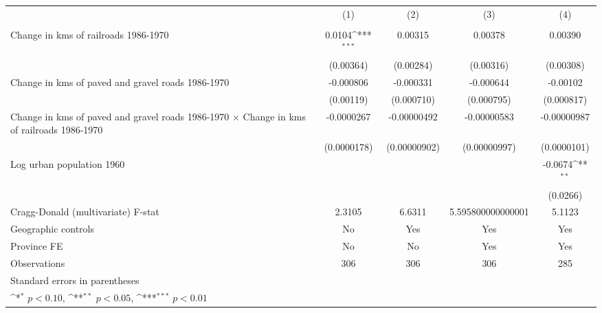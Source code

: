{
\def\sym#1{\ifmmode^{#1}\else\(^{#1}\)\fi}
\begin{tabular}{l*{4}{c}}
\hline\hline
                &\multicolumn{1}{c}{(1)}&\multicolumn{1}{c}{(2)}&\multicolumn{1}{c}{(3)}&\multicolumn{1}{c}{(4)}\\
                &\multicolumn{1}{c}{}&\multicolumn{1}{c}{}&\multicolumn{1}{c}{}&\multicolumn{1}{c}{}\\
\hline
Change in kms of railroads 1986-1970&   0.0104\sym{***}&  0.00315         &  0.00378         &  0.00390         \\
                &(0.00364)         &(0.00284)         &(0.00316)         &(0.00308)         \\
[1em]
Change in kms of paved and gravel roads 1986-1970&-0.000806         &-0.000331         &-0.000644         & -0.00102         \\
                &(0.00119)         &(0.000710)         &(0.000795)         &(0.000817)         \\
[1em]
Change in kms of paved and gravel roads 1986-1970 $\times$ Change in kms of railroads 1986-1970&-0.0000267         &-0.00000492         &-0.00000583         &-0.00000987         \\
                &(0.0000178)         &(0.00000902)         &(0.00000997)         &(0.0000101)         \\
[1em]
Log urban population 1960&                  &                  &                  &  -0.0674\sym{**} \\
                &                  &                  &                  & (0.0266)         \\
\hline
Cragg-Donald (multivariate) F-stat&   2.3105         &   6.6311         &5.595800000000001         &   5.1123         \\
Geographic controls&       No         &      Yes         &      Yes         &      Yes         \\
Province FE     &       No         &       No         &      Yes         &      Yes         \\
Observations    &      306         &      306         &      306         &      285         \\
\hline\hline
\multicolumn{5}{l}{\footnotesize Standard errors in parentheses}\\
\multicolumn{5}{l}{\footnotesize \sym{*} \(p<0.10\), \sym{**} \(p<0.05\), \sym{***} \(p<0.01\)}\\
\end{tabular}
}
